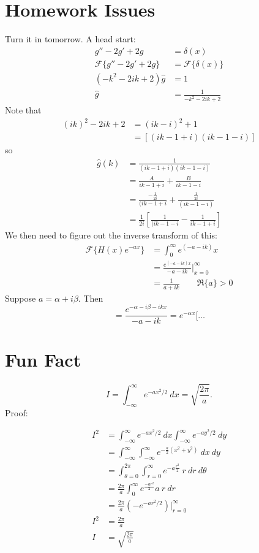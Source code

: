\documentclass[cm]{article}
\newcommand{\ghat}{\hat{g}}
\renewcommand{\F}{\mathscr F}
\renewcommand{\infint}{\int_{-\infty}^{\infty}}
\begin{document}
\section{Homework Issues}
Turn it in tomorrow. A head start:
\begin{align*}
g'' - 2 g' + 2g &= \delta(x) \\
\F \{ g'' - 2 g' + 2g \} &= \F \{ \delta(x) \} \\
(-k^2 - 2 ik + 2) \ghat &= 1\\
\ghat &= \frac{1}{-k^2 - 2 ik + 2}
\end{align*}
Note that
\begin{align*}
(ik)^2 - 2ik + 2 &= (ik - i)^2 + 1\\
&= [(ik-1+i)(ik-1-i)]
\end{align*}
so
\begin{align*}
\ghat(k) &= \frac{1}{(ik-1+i)(ik-1-i)} \\
&= \frac{A}{ik - 1 + i} + \frac{B}{ik - 1 - i} \\
&= \frac{-\frac{1}{2i}}{(ik-1+i} + \frac{\frac{1}{2i}}{(ik - 1 -i)} \\
&= \frac{1}{2i} \left[ \frac{1}{(ik - 1 - i} - \frac{1}{ik - 1 + i}\right]
\end{align*}
We then need to figure out the inverse transform of this:
\begin{align*}
\F \{ H(x) e^{-ax} \} &= \int_0^{\infty} e^(-a-ik)x \\
&= \frac{e^{(-a-ik)x}}{-a-ik}\Big|_{x=0}^{\infty} \\
&= \frac{1}{a+ik} \qquad \Re\{a\} > 0
\end{align*}
Suppose $a = \alpha + i \beta$. Then
$$ = \frac{e^{-\alpha - i \beta - i k x}}{-a-ik} = e^{- \alpha x} [ \ldots$$

\section{Fun Fact}
$$I = \infint e^{-a x^2 /2}~dx = \sqrt{\frac{2 \pi}{a}}.$$
Proof:

\begin{align*}
I^2 &= \infint e^{-ax^2/2}~dx \infint e^{-ay^2/2}~dy\\
&= \infint \infint e^{-\frac{a}{2} (x^2 + y^2)}~dx~dy \\
&= \int_{\theta = 0}^{2\pi} \int_{r = 0}^{\infty} e^{-a \frac{r^2}{2}} ~r~dr~d\theta \\
&= \frac{2 \pi}{a} \int_0^{\infty} e^{\frac{-ar^2}{2}} a~r~dr \\
&= \frac{2 \pi}{a} ( - e^{-a r^2 / 2}) \Big|_{r=0}^{\infty} \\
I^2 &= \frac{2 \pi}{a} \\
I &= \sqrt{\frac{2 \pi}{a}}
\end{align*}
\end{document}
